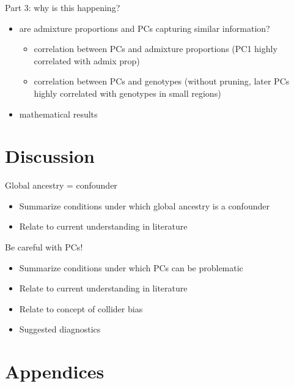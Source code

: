 \documentclass[12pt]{article}
\begin{document}
\noindent Part 3: why is this happening?

\begin{itemize}
\item are admixture proportions and PCs capturing similar information?
	\begin{itemize}
	\item correlation between PCs and admixture proportions (PC1 highly correlated with admix prop)
	\item correlation between PCs and genotypes (without pruning, later PCs highly correlated with genotypes in small regions)
	\end{itemize}
\item mathematical results
\end{itemize}


%
%


\section{Discussion}


Global ancestry = confounder
\begin{itemize}
\item Summarize conditions under which global ancestry is a confounder 
\item Relate to current understanding in literature
\end{itemize}

\noindent Be careful with PCs!
\begin{itemize}
\item Summarize conditions under which PCs can be problematic
\item Relate to current understanding in literature
\item Relate to concept of collider bias
\item Suggested diagnostics
\end{itemize}





\newpage
\section{Appendices}
\end{document}
